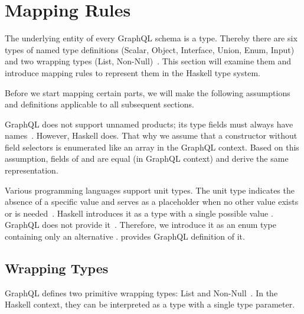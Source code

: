 
\section{Mapping Rules}

The underlying entity of every GraphQL schema is a type. 
Thereby there are six types of named type definitions 
(Scalar, Object, Interface, Union, Enum, Input) 
and two wrapping types (List, Non-Null)~\cite{gql-spec}. 
This section will examine them and introduce mapping rules 
to represent them in the Haskell type system.

Before we start mapping certain parts, we will make the following assumptions and definitions applicable to all subsequent sections.

\begin{itemize}

  GraphQL does not support unnamed products; its type fields must always have names~\cite{gql-spec}. 
  However, Haskell does. That why we assume that a constructor without field selectors is enumerated like an array in the GraphQL context. 
  Based on this assumption, fields of  and   are equal (in GraphQL context) and derive the same representation. 
  

  \label{sec:unit-type}
  Various programming languages support unit types. The unit type indicates the absence of a specific value and serves as a placeholder when no other value exists or is needed~\cite{fsharp-unit}. Haskell introduces it as a type \expr{()} with a single possible value \expr{()}.  GraphQL does not provide it~\cite{gql-spec}. Therefore, we introduce it as an enum type  containing only an alternative .  provides GraphQL definition of it.


\end{itemize}

\subsection{Wrapping Types}

GraphQL defines two primitive wrapping types: List and Non-Null~\cite{gql-spec}. In the Haskell context, they can be interpreted as a type with a single type parameter.

